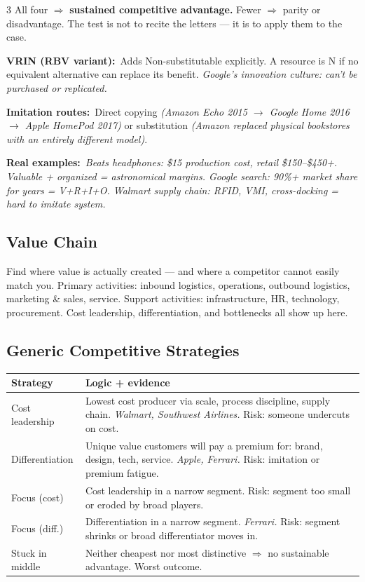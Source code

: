 \documentclass[7.6pt,letterpaper]{article}
\newcommand{\T}[1]{\textbf{\color{navy}#1}}
\newcommand{\kk}[2]{\noindent\T{#1}\ #2\par}
\newcommand{\eg}[1]{\textit{\color{mid}#1}}
\newcommand{\sh}{\rowcolor{strip}}
\newcommand{\ctab}[1]{{\fontsize{6.2pt}{7pt}\selectfont\setlength{\tabcolsep}{2.5pt}#1}}
\begin{document}
\begin{multicols}{3}
All four $\Rightarrow$ \T{sustained competitive advantage.} Fewer $\Rightarrow$ parity or disadvantage. The test is not to recite the letters --- it is to apply them to the case.

\kk{VRIN (RBV variant):}{Adds Non-substitutable explicitly. A resource is N if no equivalent alternative can replace its benefit. \eg{Google's innovation culture: can't be purchased or replicated.}}

\kk{Imitation routes:}{Direct copying \eg{(Amazon Echo 2015 $\to$ Google Home 2016 $\to$ Apple HomePod 2017)} or substitution \eg{(Amazon replaced physical bookstores with an entirely different model)}.}

\kk{Real examples:}{\eg{Beats headphones: \$15 production cost, retail \$150--\$450+. Valuable + organized = astronomical margins. Google search: 90\%+ market share for years = V+R+I+O. Walmart supply chain: RFID, VMI, cross-docking = hard to imitate system.}}

\subsection{Value Chain}

Find where value is actually created --- and where a competitor cannot easily match you. Primary activities: inbound logistics, operations, outbound logistics, marketing \& sales, service. Support activities: infrastructure, HR, technology, procurement. Cost leadership, differentiation, and bottlenecks all show up here.

\subsection{Generic Competitive Strategies}

\ctab{\begin{tabular}{@{}p{1.8cm}p{3.8cm}@{}}
\toprule
\sh \T{Strategy} & \T{Logic + evidence} \\
\midrule
Cost leadership & Lowest cost producer via scale, process discipline, supply chain. \eg{Walmart, Southwest Airlines.} Risk: someone undercuts on cost. \\
Differentiation & Unique value customers will pay a premium for: brand, design, tech, service. \eg{Apple, Ferrari.} Risk: imitation or premium fatigue. \\
Focus (cost) & Cost leadership in a narrow segment. Risk: segment too small or eroded by broad players. \\
Focus (diff.) & Differentiation in a narrow segment. \eg{Ferrari.} Risk: segment shrinks or broad differentiator moves in. \\
Stuck in middle & Neither cheapest nor most distinctive $\Rightarrow$ no sustainable advantage. Worst outcome. \\
\bottomrule
\end{tabular}}


\end{multicols}
\end{document}
